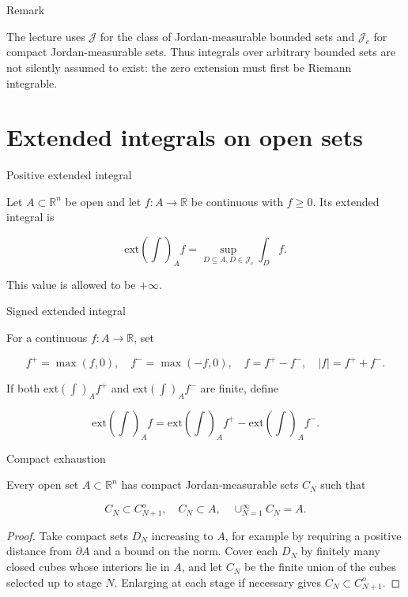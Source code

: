 \begin{qlremark}{Remark}

The lecture uses \(\mathcal{J}\) for the class of Jordan-measurable bounded sets and \(\mathcal{J}_{c}\) for compact Jordan-measurable sets. Thus integrals over arbitrary bounded sets are not silently assumed to exist: the zero extension must first be Riemann integrable.

\end{qlremark}

\section{Extended integrals on open sets}

\begin{definition}{Positive extended integral}

Let \(A \subset \mathbb{R}^{n}\) be open and let \(f:A\rightarrow\mathbb{R}\) be continuous with \(f \geq 0\). Its extended integral is

\[\text{ext}(\int)_{A}f = \sup\limits_{D \subseteq A,D \in \mathcal{J}_{c}}\int_{D}f.\]

This value is allowed to be \(+ \infty\).

\end{definition}

\begin{definition}{Signed extended integral}

For a continuous \(f:A\rightarrow\mathbb{R}\), set

\[f^{+} = \max\left( {f,0} \right),\quad f^{-} = \max\left( {- f,0} \right),\quad f = f^{+} - f^{-},\quad|f| = f^{+} + f^{-}.\]

If both \(\text{ext}(\int)_{A}f^{+}\) and \(\text{ext}(\int)_{A}f^{-}\) are finite, define

\[\text{ext}(\int)_{A}f = \text{ext}(\int)_{A}f^{+} - \text{ext}(\int)_{A}f^{-}.\]

\end{definition}

\begin{lemma}{Compact exhaustion}

Every open set \(A \subset \mathbb{R}^{n}\) has compact Jordan-measurable sets \(C_{N}\) such that

\[C_{N} \subset C_{N + 1}^{o},\quad C_{N} \subset A,\quad \cup_{N = 1}^{\infty}C_{N} = A.\]

\end{lemma}

\begin{proof}

Take compact sets \(D_{N}\) increasing to \(A\), for example by requiring a positive distance from \(\partial A\) and a bound on the norm. Cover each \(D_{N}\) by finitely many closed cubes whose interiors lie in \(A\), and let \(C_{N}\) be the finite union of the cubes selected up to stage \(N\). Enlarging at each stage if necessary gives \(C_{N} \subset C_{N + 1}^{o}\).

\end{proof}

